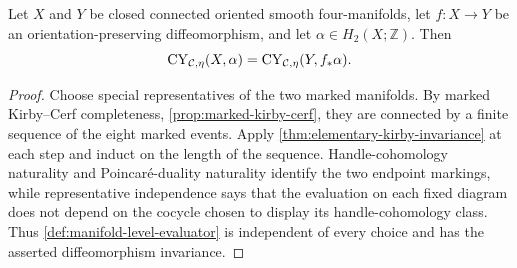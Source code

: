 \begin{theorem}
\label{prop:diffeomorphism-invariance}
Let $X$ and $Y$ be closed connected oriented smooth four-manifolds, let
$f\colon X\to Y$ be an orientation-preserving diffeomorphism, and let
$\alpha\in H_2(X;\mathbb Z)$.  Then
\[
  \operatorname{CY}_{\mathcal{C},\eta}(X,\alpha)
  =\operatorname{CY}_{\mathcal{C},\eta}(Y,f_*\alpha).
\]
\end{theorem}

\begin{proof}
Choose special representatives of the two marked manifolds.  By marked
Kirby--Cerf completeness, \cref{prop:marked-kirby-cerf}, they are connected
by a finite sequence of the eight marked events.  Apply
\cref{thm:elementary-kirby-invariance} at each step and induct on the length
of the sequence.  Handle-cohomology naturality and Poincar\'e-duality
naturality identify the two endpoint markings, while representative
independence says that the evaluation on each fixed diagram does not depend
on the cocycle chosen to display its handle-cohomology class.  Thus
\cref{def:manifold-level-evaluator} is independent of every choice and has
the asserted diffeomorphism invariance.
\end{proof}
